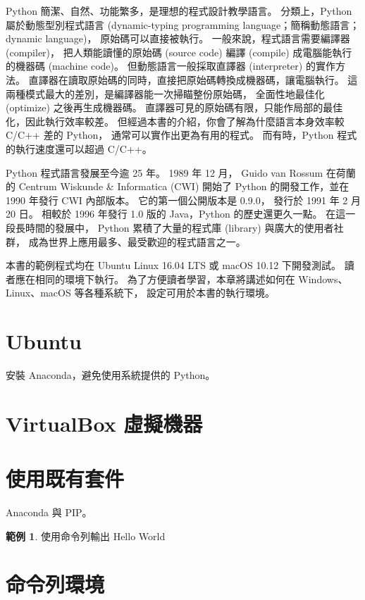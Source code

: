 \documentclass[a4paper,12pt]{book}
\theoremstyle{definition}
\newtheorem{example}{範例}[chapter]
\begin{document}
Python 簡潔、自然、功能繁多，是理想的程式設計教學語言。
分類上，Python 屬於動態型別程式語言
(dynamic-typing programming language；簡稱動態語言；dynamic language)，
原始碼可以直接被執行。
一般來說，程式語言需要編譯器 (compiler)，
把人類能讀懂的原始碼 (source code)
編譯 (compile) 成電腦能執行的機器碼 (machine code)。
但動態語言一般採取直譯器 (interpreter) 的實作方法。
直譯器在讀取原始碼的同時，直接把原始碼轉換成機器碼，讓電腦執行。
這兩種模式最大的差別，是編譯器能一次掃瞄整份原始碼，
全面性地最佳化 (optimize) 之後再生成機器碼。
直譯器可見的原始碼有限，只能作局部的最佳化，因此執行效率較差。
但經過本書的介紹，你會了解為什麼語言本身效率較 C/C++ 差的 Python，
通常可以實作出更為有用的程式。
而有時，Python 程式的執行速度還可以超過 C/C++。

Python 程式語言發展至今逾 25 年。
1989 年 12 月，
Guido van Rossum 在荷蘭的 Centrum Wiskunde \& Informatica (CWI) 開始了
Python 的開發工作，並在 1990 年發行 CWI 內部版本。
它的第一個公開版本是 0.9.0，
發行於 1991 年 2 月 20 日\cite{rossum_brief_2009}。
相較於 1996 年發行 1.0 版的 Java，Python 的歷史還更久一點。
在這一段長時間的發展中，
Python 累積了大量的程式庫 (library) 與廣大的使用者社群，
成為世界上應用最多、最受歡迎的程式語言之一。

本書的範例程式均在 Ubuntu Linux 16.04 LTS 或 macOS 10.12 下開發測試。
讀者應在相同的環境下執行。
為了方便讀者學習，本章將講述如何在 Windows、Linux、macOS 等各種系統下，
設定可用於本書的執行環境。

\section{Ubuntu}

安裝 Anaconda，避免使用系統提供的 Python。

\section{VirtualBox 虛擬機器}

\section{使用既有套件}

Anaconda 與 PIP。

\begin{example}
使用命令列輸出 Hello World
\end{example}

\section{命令列環境}
\end{document}
